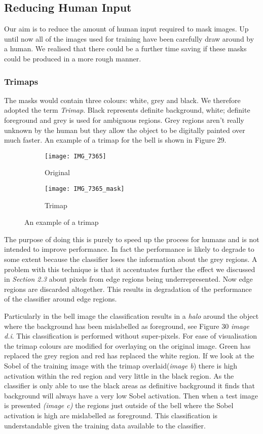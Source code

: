 \documentclass[12pt]{IIBproject}
\begin{document}
\subsection{Reducing Human Input}
Our aim is to reduce the amount of human input required to mask images. Up until now all of the images used for training have been carefully draw around by a human. We realised that there could be a further time saving if these masks could be produced in a more rough manner. 
\subsubsection{Trimaps}
The masks would contain three colours: white, grey and black. We therefore adopted the term \emph{Trimap}. Black represents definite background, white; definite foreground and grey is used for ambiguous regions. Grey regions aren't really unknown by the human but they allow the object to be digitally painted over much faster. An example of a trimap for the bell is shown in Figure 29. 

\begin{figure}[H]
\centering
\begin{subfigure}{.45\textwidth}
  \centering
  \texttt{[image: IMG\_7365]}
  \caption{Original}
  \label{fig:sub2}
\end{subfigure}
\begin{subfigure}{.45\textwidth}
  \centering
  \texttt{[image: IMG\_7365\_mask]}
  \caption{Trimap}
  \label{fig:sub1}
\end{subfigure}%


\caption{An example of a trimap}
\label{fig:test}
\end{figure}
The purpose of doing this is purely to speed up the process for humans and is not intended to improve performance. In fact the performance is likely to degrade to some extent because the classifier loses the information about the grey regions. 
A problem with this technique is that it accentuates further the effect we discussed in \emph{Section 2.3} about pixels from edge regions being underrepresented. Now edge regions are discarded altogether. This results in degradation of the performance of the classifier around edge regions. 

Particularly in the bell image the classification results in a \emph{halo} around the object where the background has been mislabelled as foreground, see Figure 30 \emph{image d.i}. This classification is performed without super-pixels. For ease of visualisation the trimap colours are modified for overlaying on the original image. Green has replaced the grey region and red has replaced the white region. If we look at the Sobel of the training image with the trimap overlaid(\emph{image b}) there is high activation within the red region and very little in the black region. As the classifier is only able to use the black areas as definitive background it finds that background will always have a very low Sobel activation. Then when a test image is presented \emph{(image c)} the regions just outside of the bell where the Sobel activation is high are mislabelled as foreground. This classification is understandable given the training data available to the classifier.
\end{document}
